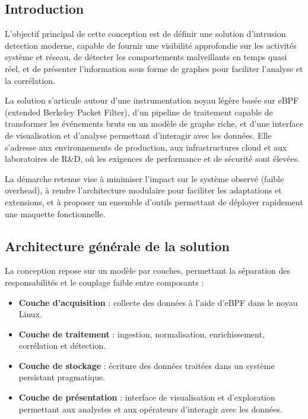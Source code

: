 \documentclass[a4paper,12pt]{article}
\begin{document}
\subsection{Introduction}

L'objectif principal de cette conception est de définir une solution d'intrusion detection moderne, capable de fournir une visibilité approfondie sur les activités système et réseau, de détecter les comportements malveillants en temps quasi réel, et de présenter l'information sous forme de graphes pour faciliter l'analyse et la corrélation.

La solution s'articule autour d'une instrumentation noyau légère basée sur eBPF (extended Berkeley Packet Filter), d'un pipeline de traitement capable de transformer les événements bruts en un modèle de graphe riche, et d'une interface de visualisation et d'analyse permettant d'interagir avec les données. Elle s'adresse aux environnements de production, aux infrastructures cloud et aux laboratoires de R\&D, où les exigences de performance et de sécurité sont élevées.

La démarche retenue vise à minimiser l'impact sur le système observé (faible overhead), à rendre l'architecture modulaire pour faciliter les adaptations et extensions, et à proposer un ensemble d'outils permettant de déployer rapidement une maquette fonctionnelle.

\subsection{Architecture générale de la solution}

La conception repose sur un modèle par couches, permettant la séparation des responsabilités et le couplage faible entre composants :

\begin{itemize}
  \item \textbf{Couche d'acquisition} : collecte des données à l'aide d'eBPF dans le noyau Linux.
  \item \textbf{Couche de traitement} : ingestion, normalisation, enrichissement, corrélation et détection.
  \item \textbf{Couche de stockage} : écriture des données traitées dans un système persistant pragmatique.
  \item \textbf{Couche de présentation} : interface de visualisation et d'exploration permettant aux analystes et aux opérateurs d'interagir avec les données.
\end{itemize}
\end{document}
